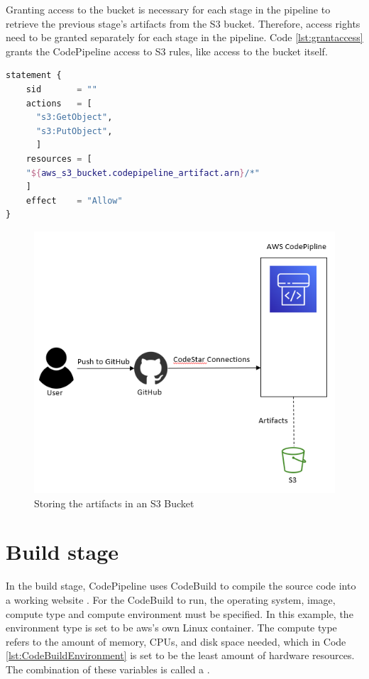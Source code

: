 Granting access to the bucket is necessary for each stage in the \gls{pipeline} to retrieve the previous stage's artifacts from the S3 bucket. Therefore, access rights need to be granted separately for each stage in the pipeline. Code \ref{lst:grantaccess} grants the CodePipeline access to S3 rules, like access to the bucket itself. 
\newpage
\vspace{4mm}
\begin{lstlisting}[language=terraform, caption=Permissions to CodePipeline, captionpos=b, frame=single, label=lst:grantaccess]
statement {
    sid       = ""
    actions   = [
      "s3:GetObject",
      "s3:PutObject",
      ]
    resources = [
    "${aws_s3_bucket.codepipeline_artifact.arn}/*"
    ]
    effect    = "Allow"
}
\end{lstlisting}

\vspace{2mm}
\begin{figure}[H]
    \centering
    \includegraphics[width=0.6\columnwidth]{Images/aws-piplin-2.png}
    \caption{Storing the artifacts in an S3 Bucket}
    \label{fig: Storing the artifacts in an S3 Bucket}
\end{figure}

\section{Build stage}
In the build stage, CodePipeline uses CodeBuild to compile the source code into a working website \cite{CodeBuildProcess}. For the CodeBuild to run, the operating system, image, compute type and compute environment must be specified. In this example, the environment type is set to be \acrshort{aws}'s own Linux container.
\newpage
The compute type refers to the amount of memory, CPUs, and disk space needed, which in Code \ref{lst:CodeBuildEnvironment} is set to be the least amount of hardware resources. The combination of these variables is called a .

